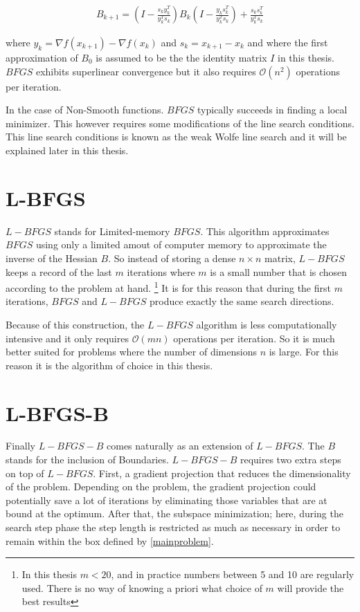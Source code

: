\begin{equation} \label{bfgsupdate}
  \begin{aligned}
    B_{k+1} = \left(I - \frac{s_ky_k^T}{y_k^Ts_k} \right) B_k \left( I - \frac{y_ks_k^T}{y_k^Ts_k} \right) + \frac{s_k s_k^T}{y_k^T s_k}
  \end{aligned}
\end{equation}

where $y_k = \nabla f(x_{k+1}) - \nabla f(x_k)$ and $s_k = x_{k+1} - x_k$ and where the first approximation of $B_0$ is assumed to be the the identity matrix $I$ in this thesis.  $BFGS$ exhibits superlinear convergence but it also requires $\mathcal{O}(n^2)$ operations per iteration. \citep{nocedal}

In the case of Non-Smooth functions. $BFGS$ typically succeeds in finding a local minimizer. This however requires some modifications of the line search conditions. This line search conditions is known as the weak Wolfe line search and it will be explained later in this thesis.

\section{L-BFGS}

$L-BFGS$ stands for Limited-memory $BFGS$. This algorithm approximates $BFGS$ using only a limited amout of computer memory to approximate the inverse of the Hessian $B$. So instead of storing a dense $n \times n$ matrix, $L-BFGS$ keeps a record of the last $m$ iterations where $m$ is a small number that is chosen according to the problem at hand. \footnote{In this thesis $m < 20$, and in practice numbers between 5 and 10 are regularly used. There is no way of knowing a priori what choice of $m$ will provide the best results} It is for this reason that during the first $m$ iterations, $BFGS$ and $L-BFGS$ produce exactly the same search directions.

Because of this construction, the $L-BFGS$ algorithm is less computationally intensive and it only requires $\mathcal{O}(mn)$ operations per iteration. So it is much better suited for problems where the number of dimensions $n$ is large. For this reason it is the algorithm of choice in this thesis.

\section{L-BFGS-B}

Finally $L-BFGS-B$ comes naturally as an extension of $L-BFGS$. The $B$ stands for the inclusion of Boundaries.  $L-BFGS-B$ requires two extra steps on top of $L-BFGS$. First, a gradient projection that reduces the dimensionality of the problem. Depending on the problem, the gradient projection could potentially save a lot of iterations by eliminating those variables that are at bound at the optimum. After that, the subspace minimization; here, during the search step phase the step length is restricted as much as necessary in order to remain within the box defined by \ref{mainproblem}.

